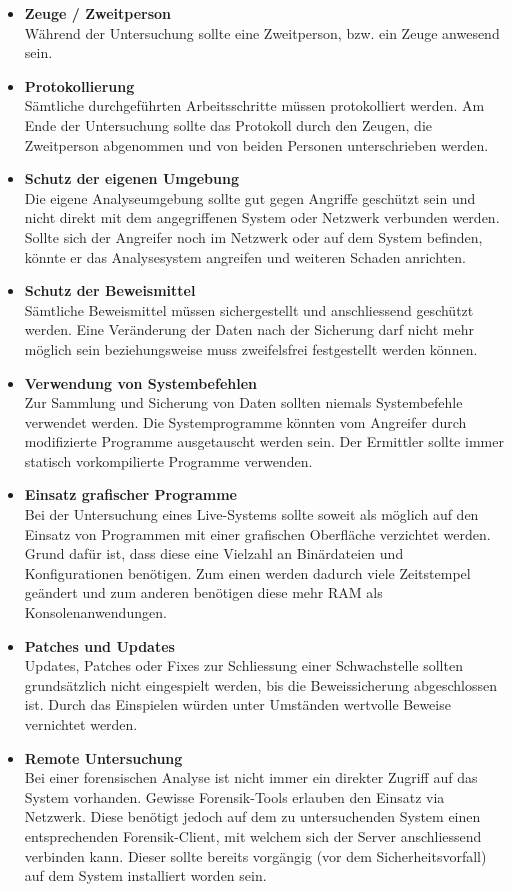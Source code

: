 \begin{itemize}
\item \textbf{Zeuge / Zweitperson} \\
Während der Untersuchung sollte eine Zweitperson, bzw. ein Zeuge anwesend sein.
\item \textbf{Protokollierung} \\
Sämtliche durchgeführten Arbeitsschritte müssen protokolliert werden. Am Ende der Untersuchung sollte das Protokoll durch den Zeugen, die Zweitperson abgenommen und von beiden Personen unterschrieben werden.
\item \textbf{Schutz der eigenen Umgebung} \\
Die eigene Analyseumgebung sollte gut gegen Angriffe geschützt sein und nicht direkt mit dem angegriffenen System oder Netzwerk verbunden werden. Sollte sich der Angreifer noch im Netzwerk oder auf dem System befinden, könnte er das Analysesystem angreifen und weiteren Schaden anrichten.
\item \textbf{Schutz der Beweismittel} \\
Sämtliche Beweismittel müssen sichergestellt und anschliessend geschützt werden. Eine Veränderung der Daten nach der Sicherung darf nicht mehr möglich sein beziehungsweise muss zweifelsfrei festgestellt werden können.
\item \textbf{Verwendung von Systembefehlen} \\
Zur Sammlung und Sicherung von Daten sollten niemals Systembefehle verwendet werden. Die Systemprogramme könnten vom Angreifer durch modifizierte Programme ausgetauscht werden sein. Der Ermittler sollte immer statisch vorkompilierte Programme verwenden.
\item \textbf{Einsatz grafischer Programme} \\
Bei der Untersuchung eines Live-Systems sollte soweit als möglich auf den Einsatz von Programmen mit einer grafischen Oberfläche verzichtet werden. Grund dafür ist, dass diese eine Vielzahl an Binärdateien und Konfigurationen benötigen. Zum einen werden dadurch viele Zeitstempel geändert und zum anderen benötigen diese mehr RAM als Konsolenanwendungen.
\item \textbf{Patches und Updates} \\
Updates, Patches oder Fixes zur Schliessung einer Schwachstelle sollten grundsätzlich nicht eingespielt werden, bis die Beweissicherung abgeschlossen ist. Durch das Einspielen würden unter Umständen wertvolle Beweise vernichtet werden. 
\item \textbf{Remote Untersuchung} \\
Bei einer forensischen Analyse ist nicht immer ein direkter Zugriff auf das System vorhanden. Gewisse Forensik-Tools erlauben den Einsatz via Netzwerk. Diese benötigt jedoch auf dem zu untersuchenden System einen entsprechenden Forensik-Client, mit welchem sich der Server anschliessend verbinden kann. Dieser sollte bereits vorgängig (vor dem Sicherheitsvorfall) auf dem System installiert worden sein.
\end{itemize}
